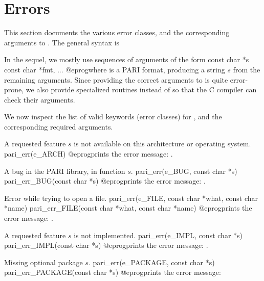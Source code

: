 \section{Errors}\label{se:errors}

This section documents the various error classes, and the corresponding
arguments to . The general syntax is


\noindent In the sequel, we mostly use sequences of arguments of the form
\bprog
  const char *s
  const char *fmt, ...
@eprog\noindent where  is a PARI
format, producing a string $s$ from the remaining arguments. Since
providing the correct arguments to  is quite error-prone, we
also provide specialized routines 
instead of  so that the C compiler
can check their arguments.

\noindent We now inspect the list of valid keywords (error classes) for
, and the corresponding required arguments.


 A requested feature $s$ is not available on this
architecture or operating system.
\bprog
  pari_err(e_ARCH)
@eprog\noindent prints the error message: .

 A bug in the PARI library, in function $s$.
\bprog
  pari_err(e_BUG, const char *s)
  pari_err_BUG(const char *s)
@eprog\noindent prints the error message: .

 Error while trying to open a file.
\bprog
  pari_err(e_FILE, const char *what, const char *name)
  pari_err_FILE(const char *what, const char *name)
@eprog\noindent prints the error message: .

 A requested feature $s$ is not implemented.
\bprog
  pari_err(e_IMPL, const char *s)
  pari_err_IMPL(const char *s)
@eprog\noindent prints the error message: .

 Missing optional package $s$.
\bprog
  pari_err(e_PACKAGE, const char *s)
  pari_err_PACKAGE(const char *s)
@eprog\noindent prints the error message: 


